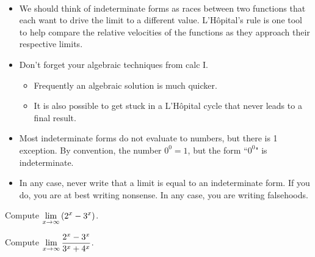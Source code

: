 \newpage

\begin{remark}\,
\begin{itemize}
\item We should think of indeterminate forms as races between two functions that each want to drive the limit to a different value.
L'H\^opital's rule is one tool to help compare the relative velocities of the functions as they approach their respective limits.
\item Don't forget your algebraic techniques from calc I.
\begin{itemize}
\item Frequently an algebraic solution is much quicker.
\item It is also possible to get stuck in a L'H\^opital cycle that never leads to a final result.
\end{itemize}
\item Most indeterminate forms do not evaluate to numbers, but there is 1 exception.  
By convention, the number $0^0 = 1$, but the form ``$0^0$" is indeterminate.  
\item In any case, never write that a limit is equal to an indeterminate form.
If you do, you are at best writing nonsense.
In any case, you are writing falsehoods.
\end{itemize}
\end{remark}

\begin{example}
Compute $\displaystyle\lim_{x\to\infty}\left(2^x-3^x\right)$.
\end{example}
\ifdefined\SOLUTION
{}
\fi
\vfill


\begin{example}
Compute $\displaystyle\lim_{x\to\infty}\frac{2^x-3^x}{3^x+4^x}$.
\end{example}
\ifdefined\SOLUTION
{}
\fi
\vfill


